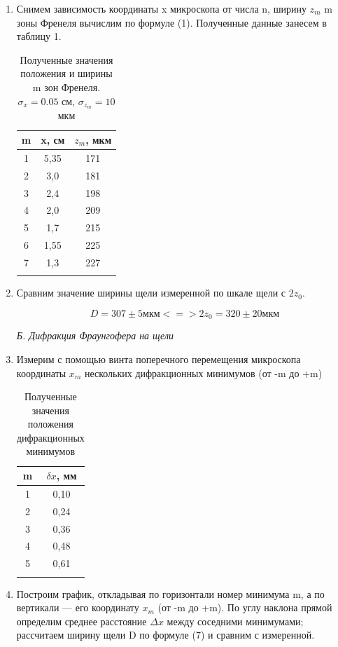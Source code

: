 \documentclass[a4paper, 12pt]{article}%
\begin{document}
	\begin{enumerate}
		\item Снимем зависимость координаты x
		микроскопа от числа n, ширину $z_m$ m зоны Френеля вычислим по формуле (1). Полученные данные занесем в таблицу 1.
		
		
		\begin{longtable}{|c|c|c|}
			\hline
			m & x, см & $z_m$, мкм  \\ \hline
			1 & 5,35 & 171 \\ \hline
			2 & 3,0 & 181 \\ \hline
			3 & 2,4 & 198 \\ \hline
			4 & 2,0 & 209 \\ \hline
			5 & 1,7 & 215 \\ \hline
			6 & 1,55 & 225 \\ \hline
			7 & 1,3 & 227 \\ \hline
			\caption{Полученные значения положения и ширины m зон Френеля.
			$\sigma_x = 0.05$ см, $\sigma_{z_m} = 10$ мкм}
		\end{longtable}
	
	\item Сравним значение ширины щели измеренной по шкале щели с $2z_0$. 
	
	$$ D = 307 \pm 5 \text{мкм} <=> 2z_0 = 320 \pm 20 \text{мкм}$$ 
	
	 \textit{Б. Дифракция Фраунгофера на щели}\\
	 
	 \item Измерим с помощью винта поперечного перемещения микроскопа координаты $x_m$ нескольких дифракционных минимумов (от -m до +m)
	 
	 \begin{longtable}{|c|c|}
	 	\hline
	 	m & $\delta x$, мм\\ \hline
	 	1 & 0,10 \\ \hline
	 	2 & 0,24 \\ \hline
	 	3 & 0,36 \\ \hline
	 	4 & 0,48 \\ \hline
	 	5 & 0,61 \\ \hline
	 	\caption{Полученные значения положения дифракционных минимумов}
	 \end{longtable}
	 
	 \item Построим график, откладывая по горизонтали номер минимума m, а по вертикали — его координату $x_m$ (от -m до +m). По углу наклона прямой определим среднее расстояние $\Delta x$ между соседними минимумами; рассчитаем ширину щели D по формуле (7) и сравним с измеренной.
	 

\end{enumerate}
\end{document}
